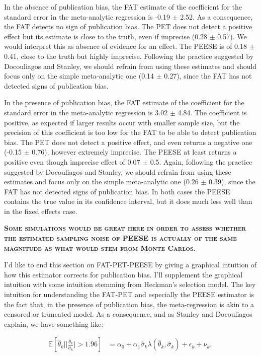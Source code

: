 \documentclass[
]{book}
\newcommand{\esp}[1]{\mathbb{E}[ #1 ]}
\theoremstyle{definition}
\theoremstyle{definition}
\theoremstyle{definition}
\theoremstyle{definition}
\theoremstyle{remark}
\begin{document}
In the absence of publication bias, the FAT estimate of the coefficient for the standard error in the meta-analytic regression is -0.19 \(\pm\) 2.52.
As a consequence, the FAT detects no sign of publication bias.
The PET does not detect a positive effect but its estimate is close to the truth, even if imprecise (0.28 \(\pm\) 0.57).
We would interpret this as absence of evidence for an effect.
The PEESE is of 0.18 \(\pm\) 0.41, close to the truth but highly imprecise.
Following the practice suggested by Docouliagos and Stanley, we should refrain from using these estimates and should focus only on the simple meta-analytic one (0.14 \(\pm\) 0.27), since the FAT has not detected signs of publication bias.

In the presence of publication bias, the FAT estimate of the coefficient for the standard error in the meta-analytic regression is 3.02 \(\pm\) 4.84.
The coefficient is positive, as expected if larger results occur with smaller sample size, but the precision of this coefficient is too low for the FAT to be able to detect publication bias.
The PET does not detect a positive effect, and even returns a negative one (-0.15 \(\pm\) 0.76), however extremely imprecise.
The PEESE at least returns a positive even though imprecise effect of 0.07 \(\pm\) 0.5.
Again, following the practice suggested by Docouliagos and Stanley, we should refrain from using these estimates and focus only on the simple meta-analytic one (0.26 \(\pm\) 0.39), since the FAT has not detected signs of publication bias.
In both cases the PEESE contains the true value in its confidence interval, but it does much less well than in the fixed effects case.

\textbf{\textsc{Some simulations would be great here in order to assess whether the estimated sampling noise of PEESE is actually of the same magnitude as what would stem from Monte Carlos.}}

I'd like to end this section on FAT-PET-PEESE by giving a graphical intuition of how this estimator corrects for publication bias.
I'll supplement the graphical intuition with some intuition stemming from Heckman's selection model.
The key intuition for understanding the FAT-PET and especially the PEESE estimator is the fact that, in the presence of publication bias, the meta-regression is akin to a censored or truncated model.
As a consequence, and as Stanley and Docouliagos explain, we have something like:

\begin{align*}
\esp{\hat{\theta}_k||\frac{\hat{\theta}_k}{\hat{\sigma}_k}|>1.96} & = \alpha_0 + \alpha_1\hat{\sigma}_k\lambda(\hat{\theta}_k,\hat{\sigma}_k) + \epsilon_k + \nu_k,
\end{align*}
\end{document}
